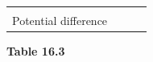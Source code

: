 \begin{enumerate}[noitemsep, label=\textbf{\arabic*}. ]
{{\begin{center}
\begin{xtabular}[t]{|l|l|l|l|}
         &
    
    
         &
    
    
     \tabularnewline{}
    
    
        Potential difference &
    
    
         &
    
    
         &
    
    
     \tabularnewline{}
    \end{xtabular}
      \end{center}
    \begin{center}{\small\bfseries Table 16.3}\end{center}
    
    \addtocounter{footnote}{-0}
    
}}
\end{enumerate}
